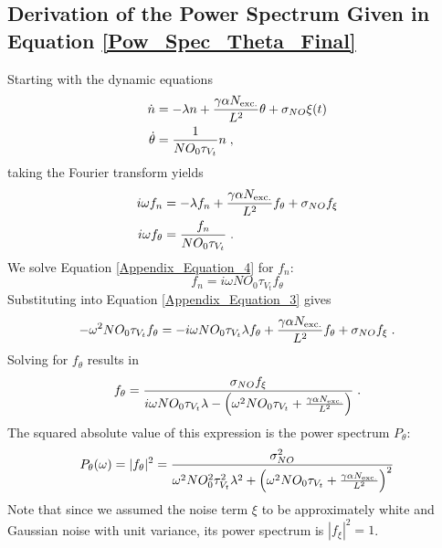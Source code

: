 \documentclass[10pt,a4paper]{article}
\begin{document}
\begin{appendices}

\section{Derivation of the Power Spectrum Given in Equation \eqref{Pow_Spec_Theta_Final}}\label{Appendix_Power_Spectrum}
Starting with the dynamic equations
\begin{align}
\dot{n} &= -\lambda n + \frac{\gamma \alpha N_{\rm exc.}}{L^2}\theta + \sigma_{NO} \xi(t) \label{Appendix_Equation_1}\\
\dot{\theta} &= \frac{1}{NO_0 \tau_{V_t}} n \; , \label{Appendix_Equation_2}
\end{align}
taking the Fourier transform yields
\begin{align}
i\omega f_n &= - \lambda f_n + \frac{\gamma \alpha N_{\rm exc.}}{L^2}f_\theta + \sigma_{NO} f_{\xi} \label{Appendix_Equation_3} \\
i\omega f_\theta &= \frac{f_n}{NO_0\tau_{V_t}}\;. \label{Appendix_Equation_4}
\end{align}
We solve Equation \eqref{Appendix_Equation_4} for $f_n$:
\begin{equation}
f_n = i\omega NO_0 \tau_{V_t} f_\theta \label{Appendix_Equation_5}
\end{equation}
Substituting into Equation \eqref{Appendix_Equation_3} gives
\begin{equation}
-\omega^2 NO_0 \tau_{V_t} f_\theta = - i\omega NO_0 \tau_{V_t} \lambda f_\theta + \frac{\gamma \alpha N_{\rm exc.}}{L^2}f_\theta + \sigma_{NO} f_{\xi} \; . \label{Appendix_Equation_6}
\end{equation}
Solving for $f_\theta$ results in
\begin{equation}
f_\theta = \frac{\sigma_{NO} f_{\xi}}{i\omega NO_0 \tau_{V_t} \lambda - \left(\omega^2 NO_0 \tau_{V_t} + \frac{\gamma \alpha N_{\rm exc.}}{L^2} \right)} \; . \label{Appendix_Equation_7}
\end{equation}
The squared absolute value of this expression is the power spectrum $P_\theta$:
\begin{equation}
P_\theta (\omega) = |f_\theta|^2 = \frac{\sigma_{NO}^2}{\omega^2 NO_0^2 \tau_{V_t}^2 \lambda^2 + \left( \omega^2 NO_0 \tau_{V_t} + \frac{\gamma \alpha N_{\rm exc.}}{L^2}\right)^2} \label{Appendix_Equation_8}
\end{equation}
Note that since we assumed the noise term $\xi$ to be approximately white and Gaussian noise with unit variance, its power spectrum is $|f_{\xi}|^2 = 1$.

\end{appendices}
\end{document}
